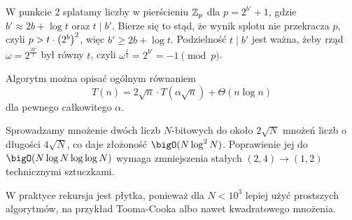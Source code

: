 W punkcie 2 splatamy liczby w pierścieniu \( \mathbb{Z}_p \) dla \( p = 2^{b'} + 1 \), gdzie \( b' \approx 2b + \log t \) oraz \( t \mid b' \). Bierze się to stąd, że wynik splotu nie przekracza \( p \), czyli \( p > t \cdot \left(2^b\right)^2 \), więc \( b' \geq 2b + \log t \).
Podzielność \( t \mid b' \) jest ważna, żeby rząd \( \omega = 2^{\frac{2b'}{t}} \) był równy \( t \), czyli \( \omega^{\frac{t}{2}} = 2^{b'} = -1 \pmod{p} \).

Algorytm można opisać ogólnym równaniem
\[
	T(n) = 2 \sqrt{n} \cdot T(\alpha \sqrt{n}) + \Theta(n \log n)
\]
dla pewnego całkowitego \( \alpha \).

Sprowadzamy mnożenie dwóch liczb \( N \)-bitowych do około \( 2\sqrt{N} \) mnożeń liczb o długości \( 4\sqrt{N} \), co daje złożoność \( \bigO(N \log^2 N) \).
Poprawienie jej do \( \bigO(N \log N \log \log N) \) wymaga zmniejszenia stałych \( (2, 4) \rightarrow (1, 2) \) technicznymi sztuczkami.

W praktyce rekursja jest płytka, ponieważ dla \( N < 10^3 \) lepiej użyć prostszych algorytmów, na przykład Tooma-Cooka albo nawet kwadratowego mnożenia.
